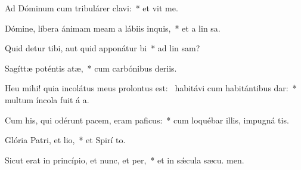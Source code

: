 \item Ad Dóminum cum tribulárer clavi:~* et vit me.
\item Dómine, líbera ánimam meam a lábiis inquis,~* et a lin sa.
\item Quid detur tibi, aut quid apponátur bi~* ad lin sam?
\item Sagíttæ poténtis atæ,~* cum carbónibus deriis.
\item Heu mihi! quia incolátus meus prolontus est:~\pscross{} habitávi cum habitántibus dar:~* multum íncola fuit á a.
\item Cum his, qui odérunt pacem, eram paficus:~* cum loquébar illis, impugná  tis.
\item Glória Patri, et lio,~* et Spirí to.
\item Sicut erat in princípio, et nunc, et per,~* et in sǽcula sæcu. men.
